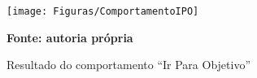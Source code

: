 \begin{figure}[!ht]
\centering
\caption{Resultado do comportamento ``Ir Para Objetivo''}
\label{fig:resultadoImplementadoIPO}
		\centering
		\texttt{[image: Figuras/ComportamentoIPO]}%

	\textbf{Fonte: autoria própria}
\end{figure}
